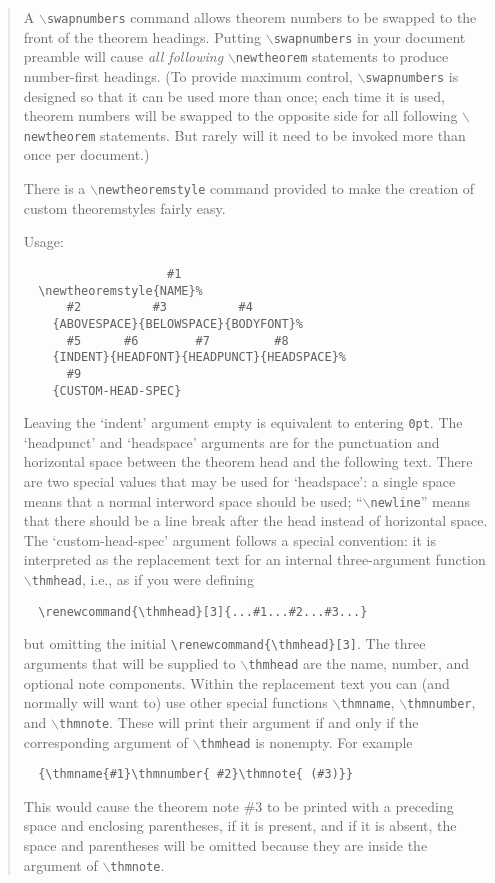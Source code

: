 \documentclass[a4paper]{article}
\newcommand\cn[1]{$\mathtt\backslash$\texttt{#1}}
\theoremstyle{definition}
\theoremstyle{remark}
\theoremstyle{remark}
\begin{document}
\begin{quotation}
     A \cn{swapnumbers} command allows theorem numbers to be swapped to
     the front of the theorem headings. Putting \cn{swapnumbers} in your
     document preamble will cause \emph{all following} \cn{newtheorem}
     statements to produce number-first headings. (To provide maximum
     control, \cn{swapnumbers} is designed so that it can be used more
     than once; each time it is used, theorem numbers will be swapped to
     the opposite side for all following \cn{newtheorem} statements. But
     rarely will it need to be invoked more than once per document.)

There is a \cn{newtheoremstyle} command provided to make the
     creation of custom theoremstyles fairly easy.

Usage:
\begin{verbatim}
                    #1
  \newtheoremstyle{NAME}%
      #2          #3          #4
    {ABOVESPACE}{BELOWSPACE}{BODYFONT}%
      #5      #6        #7         #8
    {INDENT}{HEADFONT}{HEADPUNCT}{HEADSPACE}%
      #9
    {CUSTOM-HEAD-SPEC}
\end{verbatim}
     Leaving the `indent' argument empty is equivalent to entering
     \verb|0pt|. The `headpunct' and `headspace' arguments are for the
     punctuation and horizontal space between the theorem head and the
     following text. There are two special values that may be used for
     `headspace': a single space means that a normal interword space
     should be used; ``\cn{newline}'' means that there should be a line
     break after the head instead of horizontal space. The
     `custom-head-spec' argument follows a special convention: it is
     interpreted as the replacement text for an internal three-argument
     function \cn{thmhead}, i.e., as if you were defining
\begin{verbatim}
  \renewcommand{\thmhead}[3]{...#1...#2...#3...}
\end{verbatim}
     but omitting the initial \verb|\renewcommand{\thmhead}[3]|. The three
     arguments that will be supplied to \cn{thmhead} are the name,
     number, and optional note components. Within the replacement text
     you can (and normally will want to) use other special functions
     \cn{thmname}, \cn{thmnumber}, and \cn{thmnote}. These will print
     their argument if and only if the corresponding argument of
     \cn{thmhead} is nonempty. For example
\begin{verbatim}
  {\thmname{#1}\thmnumber{ #2}\thmnote{ (#3)}}
\end{verbatim}
     This would cause the theorem note \#3 to be printed with a
     preceding space and enclosing parentheses, if it is present, and if
     it is absent, the space and parentheses will be omitted because
     they are inside the argument of \cn{thmnote}.


\end{quotation}
\end{document}
